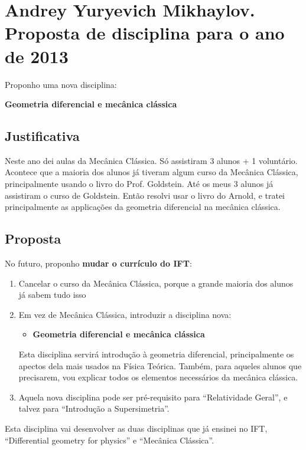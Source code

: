 \documentclass[12pt]{article}
\begin{document}
 
\section{Andrey Yuryevich Mikhaylov. Proposta de disciplina para o ano de 2013}

Proponho uma nova disciplina: 
\begin{center}
{\bf Geometria diferencial e mecânica clássica}
\end{center}

\subsection{Justificativa}
Neste ano dei aulas da Mecânica Clássica. Só assistiram 3 alunos + 1 
voluntário. Acontece que a maioria dos alunos já tiveram algum curso da 
Mecânica Clássica, principalmente usando o livro do Prof. Goldstein. Até os 
meus 3 alunos já assistiram o curso de Goldstein. Então resolvi usar o livro 
do Arnold, e tratei principalmente as applicações da geometria diferencial na 
mecânica clássica.

\subsection{Proposta}
No futuro, proponho {\bf mudar o currículo do IFT}:

\begin{enumerate}
   \item Cancelar o curso da Mecânica Clássica, porque a grande maioria dos 
      alunos já sabem tudo isso
   \item Em vez de Mecânica Clássica, introduzir a disciplina nova:
      \begin{itemize}
      \item {\large \bf Geometria diferencial e mecânica clássica}
      \end{itemize}
      Esta disciplina servirá introdução à geometria diferencial, 
      principalmente os apectos dela mais usados na Física Teórica. Também, 
      para aqueles alunos que precisarem, vou explicar todos os elementos 
      necessários da mecânica clássica.
   \item Aquela nova disciplina pode ser pré-requisito 
      para ``Relatividade Geral'', e talvez para
      ``Introdução a Supersimetria''.
\end{enumerate}
Esta disciplina vai desenvolver as duas disciplinas que já ensinei no IFT,
``Differential geometry for physics'' e ``Mecânica Clássica''.
\end{document}
